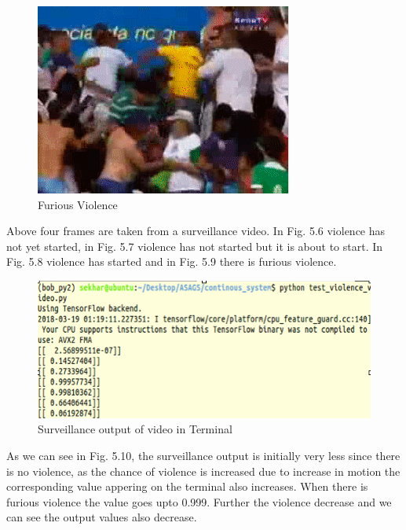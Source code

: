 \begin{figure}[H]
\centering
\includegraphics[scale = 0.5]{scene5.png}
\caption{Furious Violence}
\end{figure}
\par
Above four frames are taken from a surveillance video. In Fig. 5.6 violence has not yet started, in Fig. 5.7 violence has not started but it is about to start. In Fig. 5.8 violence has started and in Fig. 5.9 there is furious violence.
\begin{figure}[H]
\centering
\includegraphics[width = \linewidth]{terminal_out.png}
\caption{Surveillance output of video in Terminal}
\end{figure}
As we can see in Fig. 5.10, the surveillance output is initially very less since there is no violence, as the chance of violence is increased due to increase in motion the corresponding value appering on the terminal also increases. When there is furious violence the value goes upto 0.999. Further the violence decrease and we can see the output values also decrease.
